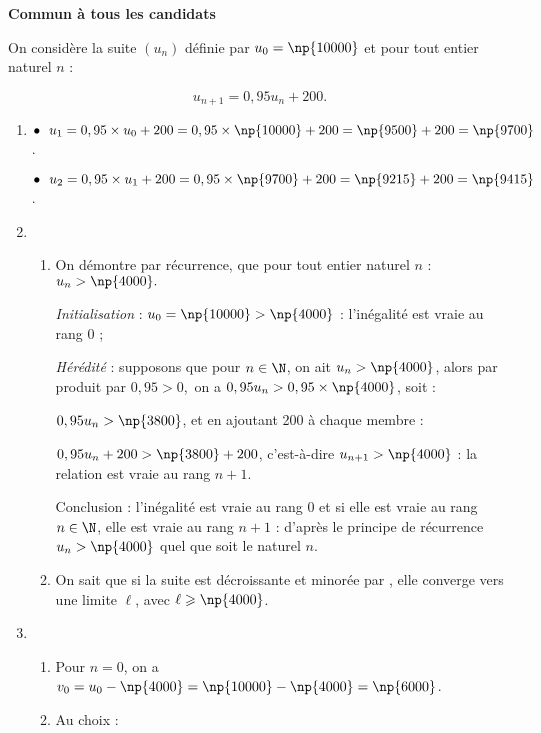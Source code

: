
\textbf{Commun à tous les candidats}

\medskip

On considère la suite $\left(u_n\right)$ définie par $u_0 = \np{10000}$ et pour tout entier naturel $n$ : 

\[u_{n+1} = 0,95u_n + 200.\]

\begin{enumerate}
\item $\bullet~~u_1 = 0,95 \times u_0 + 200 = 0,95 \times \np{10000} + 200 = \np{9500} + 200 = \np{9700}$.%

$\bullet~~u_2 = 0,95 \times u_1 + 200 = 0,95 \times \np{9700} + 200 = \np{9215} + 200 = \np{9415}$. 
\item 
	\begin{enumerate}
		\item On démontre  par récurrence, que pour tout entier naturel $n$ : $u_n > \np{4000}.$
		
\emph{Initialisation} : $u_0 = \np{10000} > \np{4000}$ : l'inégalité est vraie au rang $0$ ;

\emph{Hérédité} : supposons que pour $n \in \N$, on ait $u_n > \np{4000}$, alors par produit par $0,95 > 0$,\, on a $0,95u_n > 0,95 \times \np{4000}$, soit :

$0,95u_n > \np{3800}$, et en ajoutant 200 à chaque membre :

$0,95u_n  + 200 > \np{3800} + 200$, c'est-à-dire $u_{n+1} > \np{4000}$ : la relation est vraie au rang $n + 1$.

Conclusion : l'inégalité est vraie au rang $0$ et si elle est vraie au rang $n \in \N$, elle est vraie au rang $n + 1$ : d'après le principe de récurrence $u_n > \np{4000}$ quel que soit le naturel $n$.
		\item %
On sait que si la suite est décroissante et minorée par , elle converge vers une limite $\ell$, avec $\ell \geqslant \np{4000}$.
	\end{enumerate}
\item  %
	\begin{enumerate}
		\item %
Pour $n = 0$, on a $v_0 = u_0 -  \np{4000} =  \np{10000} -  \np{4000} =  \np{6000}$.
		\item %
Au choix :
		

\end{enumerate}
\end{enumerate}
